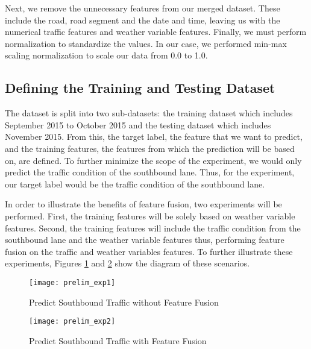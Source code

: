 Next, we remove the unnecessary features from our merged dataset. These include the road, road segment and the date and time, leaving us with the numerical traffic features and weather variable features. Finally, we must perform normalization to standardize the values. In our case, we performed min-max scaling normalization to scale our data from 0.0 to 1.0.



\subsection{Defining the Training and Testing Dataset}
The dataset is split into two sub-datasets: the training dataset which includes September 2015 to October 2015 and the testing dataset which includes November 2015. From this, the target label, the feature that we want to predict, and the training features, the features from which the prediction will be based on, are defined. To further minimize the scope of the experiment, we would only predict the traffic condition of the southbound lane. Thus, for the experiment, our target label would be the traffic condition of the southbound lane.

In order to illustrate the benefits of feature fusion, two experiments will be performed. First, the training features will be solely based on weather variable features. Second, the training features will include the traffic condition from the southbound lane and the weather variable features thus, performing feature fusion on the traffic and weather variables features. To further illustrate these experiments, Figures \ref{figure:prelim_exp1} and \ref{figure:prelim_exp2} show the diagram of these scenarios.




\begin{figure}[h]
\caption{Predict Southbound Traffic without Feature Fusion}
\centering
\texttt{[image: prelim\_exp1]}
\label{figure:prelim_exp1}
\end{figure}

\begin{figure}[h]
\caption{Predict Southbound Traffic with Feature Fusion}
\centering
\texttt{[image: prelim\_exp2]}
\label{figure:prelim_exp2}
\end{figure}


